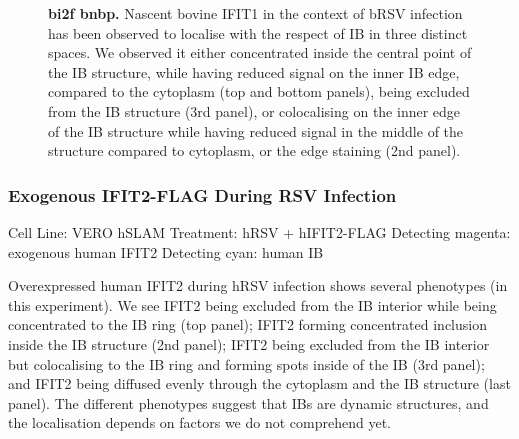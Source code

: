\begin{figure}
\begin{subfigure}{1\textwidth}
    \end{subfigure}
    \caption[bi2f bnbp]{\textbf{bi2f bnbp.} Nascent bovine IFIT1 in the context of bRSV infection has been observed to localise with the respect of IB in three distinct spaces. We observed it either concentrated inside the central point of the IB structure, while having reduced signal on the inner IB edge, compared to the cytoplasm (top and bottom panels), being excluded from the IB structure (3rd panel), or colocalising on the inner edge of the IB structure while having reduced signal in the middle of the structure compared to cytoplasm, or the edge staining (2nd panel).}
    \label{fig:bi2f bnbp}
\end{figure}

\subsubsection{Exogenous IFIT2-FLAG During RSV Infection} \label{Exogenous IFIT2-FLAG During RSV Infection}
Cell Line: VERO hSLAM \newline
Treatment: hRSV + hIFIT2-FLAG \newline
Detecting magenta: exogenous human IFIT2 \newline
Detecting cyan: human IB \newline

Overexpressed human IFIT2 during hRSV infection shows several phenotypes (in this experiment). We see IFIT2 being excluded from the IB interior while being concentrated to the IB ring (top panel); IFIT2 forming concentrated inclusion inside the IB structure (2nd panel); IFIT2 being excluded from the IB interior but colocalising to the IB ring and forming spots inside of the IB (3rd panel); and IFIT2 being diffused evenly through the cytoplasm and the IB structure (last panel). The different phenotypes suggest that IBs are dynamic structures, and the localisation depends on factors we do not comprehend yet. 

